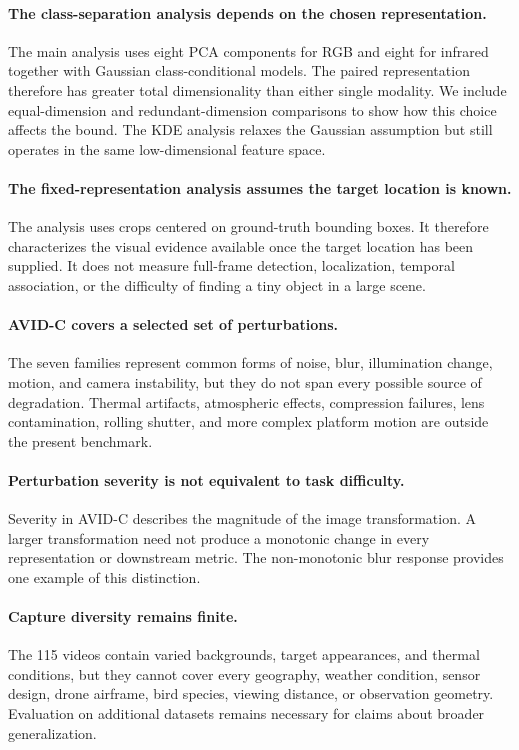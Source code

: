 \documentclass[10pt]{article}
\newcommand{\corrupt}{\textsc{AVID-C}}
\begin{document}
\paragraph{The class-separation analysis depends on the chosen representation.}
The main analysis uses eight PCA components for RGB and eight for infrared together with Gaussian class-conditional models. The paired representation therefore has greater total dimensionality than either single modality. We include equal-dimension and redundant-dimension comparisons to show how this choice affects the bound. The KDE analysis relaxes the Gaussian assumption but still operates in the same low-dimensional feature space.

\paragraph{The fixed-representation analysis assumes the target location is known.}
The analysis uses crops centered on ground-truth bounding boxes. It therefore characterizes the visual evidence available once the target location has been supplied. It does not measure full-frame detection, localization, temporal association, or the difficulty of finding a tiny object in a large scene.

\paragraph{\corrupt{} covers a selected set of perturbations.}
The seven families represent common forms of noise, blur, illumination change, motion, and camera instability, but they do not span every possible source of degradation. Thermal artifacts, atmospheric effects, compression failures, lens contamination, rolling shutter, and more complex platform motion are outside the present benchmark.

\paragraph{Perturbation severity is not equivalent to task difficulty.}
Severity in \corrupt{} describes the magnitude of the image transformation. A larger transformation need not produce a monotonic change in every representation or downstream metric. The non-monotonic blur response provides one example of this distinction.

\paragraph{Capture diversity remains finite.}
The 115 videos contain varied backgrounds, target appearances, and thermal conditions, but they cannot cover every geography, weather condition, sensor design, drone airframe, bird species, viewing distance, or observation geometry. Evaluation on additional datasets remains necessary for claims about broader generalization.
\end{document}
